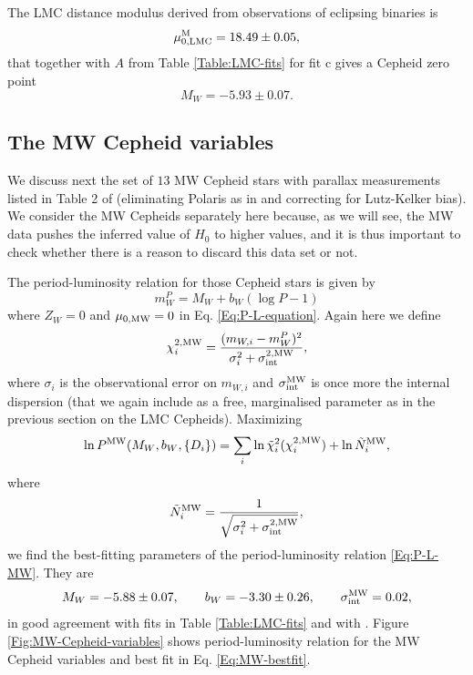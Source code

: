 The LMC distance modulus derived from observations of eclipsing binaries \cite{Pietrzynski:2013gia} is 
\begin{equation}
\mu_{0,\mathrm{LMC}}^{\rm M} = 18.49 \pm 0.05,
\label{Eq:LMC-measured-distance-modulus}
\end{equation}
that together with $A$ from Table \ref{Table:LMC-fits} for fit c gives a Cepheid zero point
\begin{equation}\label{Eq:zero-point-LMC}
M_W = -5.93 \pm 0.07.
\end{equation}


\subsection{The MW Cepheid variables}
\label{Subsection:MW-1}

We discuss next the set of $13$ MW Cepheid stars with parallax measurements listed in Table 2 of \cite{vanLeeuwen:2007xw} (eliminating Polaris as in \cite{Efstathiou:2013via} and correcting for Lutz-Kelker bias). We consider the MW Cepheids separately here because, as we will see, the MW data pushes the inferred value of $H_0$ to higher values, and it is thus important to check whether there is a reason to discard this data set or not.

The period-luminosity relation for those Cepheid stars is given by
\begin{equation}\label{Eq:P-L-MW}
m^P_W = M_W + b_W (\log P - 1)
\end{equation}
where $Z_W=0$ and $\mu_{0,\mathrm{MW}}=0$ in Eq. \eqref{Eq:P-L-equation}. Again here we define 
\begin{equation}\label{Eq:chi2-MW}
\chi^{2,\mathrm{MW}}_{i} = \frac{(m_{W,i} - m^P_{W})^2}{\sigma_i^2 + \sigma^{2,\mathrm{MW}}_{\mathrm{int}}},
\end{equation}
where $\sigma_i$ is the observational error on $m_{W,i}$ and $\sigma_{\mathrm{int}}^{\mathrm{MW}}$ is once more the internal dispersion (that we again include as a free, marginalised parameter as in the previous section on the LMC Cepheids). Maximizing  
\begin{equation}
\label{Eq:likelihood-HP}
\ln P^{\mathrm{MW}}(M_W,b_W,\lbrace D_i \rbrace) = \sum_{i} \ln \tilde{\chi}_i^{2}(\chi^{2,\mathrm{MW}}_{i}) + \ln \tilde{N}^{\mathrm{MW}}_{i},
\end{equation}
where 
\begin{equation}
\label{Eq:normalization}
\tilde{N}^{\mathrm{MW}}_i = \frac{1}{\sqrt{\sigma_i^2 +\sigma^{2,\mathrm{MW}}_{\mathrm{int}}}},
\end{equation}
we find the best-fitting parameters of the period-luminosity relation \eqref{Eq:P-L-MW}. They are 
\begin{equation}\label{Eq:MW-bestfit}
M_W = -5.88 \pm 0.07  , \qquad b_W = -3.30 \pm 0.26  , \qquad \sigma_{\mathrm{int}}^{\mathrm{MW}} = 0.02 ,
\end{equation}
in good agreement with fits in Table \ref{Table:LMC-fits} and with \cite{Efstathiou:2013via}. 
Figure \ref{Fig:MW-Cepheid-variables} shows period-luminosity relation for the MW Cepheid variables and best fit in Eq. \eqref{Eq:MW-bestfit}.

